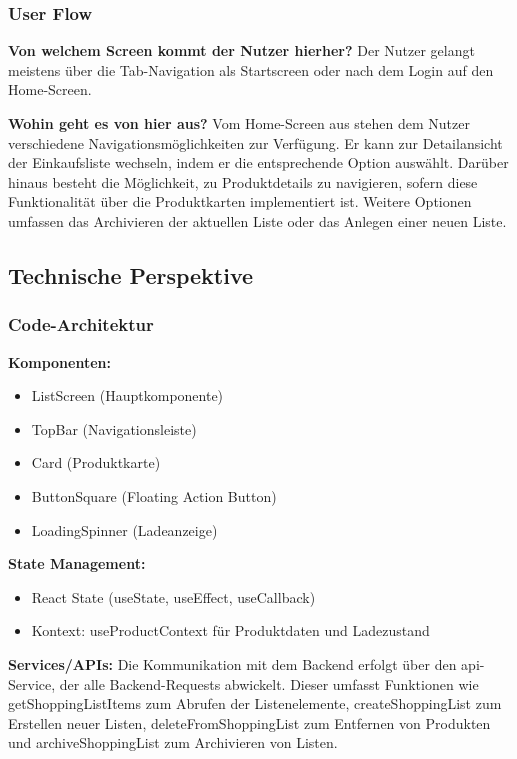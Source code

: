 \subsubsection{User Flow}

\textbf{Von welchem Screen kommt der Nutzer hierher?}
Der Nutzer gelangt meistens über die Tab-Navigation als Startscreen oder nach dem Login auf den Home-Screen.

\noindent\textbf{Wohin geht es von hier aus?}
Vom Home-Screen aus stehen dem Nutzer verschiedene Navigationsmöglichkeiten zur Verfügung. Er kann zur Detailansicht der Einkaufsliste wechseln, indem er die entsprechende Option auswählt. Darüber hinaus besteht die Möglichkeit, zu Produktdetails zu navigieren, sofern diese Funktionalität über die Produktkarten implementiert ist. Weitere Optionen umfassen das Archivieren der aktuellen Liste oder das Anlegen einer neuen Liste.

\subsection{Technische Perspektive}

\subsubsection{Code-Architektur}

\textbf{Komponenten:}
\begin{itemize}
    \item ListScreen (Hauptkomponente)
    \item TopBar (Navigationsleiste)
    \item Card (Produktkarte)
    \item ButtonSquare (Floating Action Button)
    \item LoadingSpinner (Ladeanzeige)
\end{itemize}

\noindent\textbf{State Management:}
\begin{itemize}
    \item React State (useState, useEffect, useCallback)
    \item Kontext: useProductContext für Produktdaten und Ladezustand
\end{itemize}

\noindent\textbf{Services/APIs:}
Die Kommunikation mit dem Backend erfolgt über den api-Service, der alle Backend-Requests abwickelt. Dieser umfasst Funktionen wie getShoppingListItems zum Abrufen der Listenelemente, createShoppingList zum Erstellen neuer Listen, deleteFromShoppingList zum Entfernen von Produkten und archiveShoppingList zum Archivieren von Listen.

